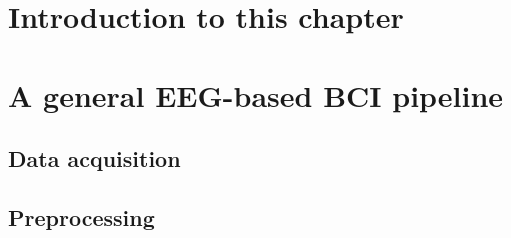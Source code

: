 \section{Introduction to this chapter}
\label{sec:processing_signals_introduction}

\lipsum[1-3]



\section{A general EEG-based BCI pipeline}
\label{sec:processing_signals_general_pipeline}



\lipsum[1-3]


\subsection{Data acquisition}
\label{subsec:processing_signals_general_pipeline_data_acquisition}


\lipsum[1-2]


\subsection{Preprocessing}
\label{subsec:processing_signals_general_pipeline_preprocessing}



